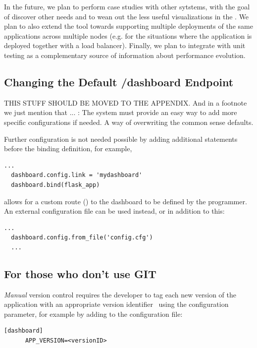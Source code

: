 \documentclass[conference]{IEEEtran}
\begin{document}
In the future, we plan to perform case studies with other sytstems, with the goal of discover other needs and to wean out the less useful visualizations in the \tool. We plan to also extend the tool towards supporting multiple deployments of the same applications across multiple nodes (e.g. for the situations where the application is deployed together with a load balancer). Finally, we plan to integrate \tool with unit testing as a complementary source of information about performance evolution.



\newpage
\appendix

  \subsection{Changing the Default /dashboard Endpoint }

  THIS STUFF SHOULD BE MOVED TO THE APPENDIX. And in a footnote we just mention that ... : The system must provide an easy way to add more specific configurations if needed. A way of overwriting the common sense defaults.

  Further configuration is not needed possible by adding additional statements before the binding definition, for example,

  \begin{lstlisting}[style=custompython]
  ...
  dashboard.config.link = 'mydashboard'
  dashboard.bind(flask_app)
  \end{lstlisting}
  
  allows for a custom route () to the dashboard to be defined by the programmer. An external configuration file can be used instead, or in addition to this:
  
  \begin{lstlisting}[style=custompython]
  ...
  dashboard.config.from_file('config.cfg')
  ...
  \end{lstlisting}


  \subsection{For those who don't use GIT}


    \textit{Manual} version control requires the developer to tag each new version of the application with an appropriate version identifier~\cite{papazoglou2011managing} using the  configuration parameter, for example by adding to the configuration file:
    
      \begin{lstlisting}[style=custompython]
      [dashboard]
      APP_VERSION=<versionID>
      \end{lstlisting}










\end{document}
